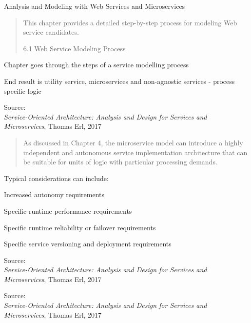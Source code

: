 \documentclass[Screen16to9,17pt]{foils}
\begin{document}
Analysis and Modeling with Web Services and Microservices

\begin{quote}
This chapter provides a detailed step-by-step process for modeling Web service candidates.

6.1 Web Service Modeling Process
\end{quote}

\begin{list2}
\item Chapter goes through the steps of a service modelling process
\item End result is utility service, microservices and non-agnostic services - process specific logic
\end{list2}
Source: {\footnotesize\\
\emph{Service‑Oriented Architecture: Analysis and Design for Services and Microservices}, Thomas Erl, 2017}



\begin{quote}
  As discussed in Chapter 4, the microservice model can introduce a highly
  independent and autonomous service implementation architecture that can be suitable
  for units of logic with particular processing demands.
\end{quote}

Typical considerations can include:
\begin{list2}
\item Increased autonomy requirements
\item Specific runtime performance requirements
\item Specific runtime reliability or failover requirements
\item Specific service versioning and deployment requirements
\end{list2}
Source: {\footnotesize\\
\emph{Service‑Oriented Architecture: Analysis and Design for Services and Microservices}, Thomas Erl, 2017}



Source: {\footnotesize\\
\emph{Service‑Oriented Architecture: Analysis and Design for Services and Microservices}, Thomas Erl, 2017}


\end{document}
